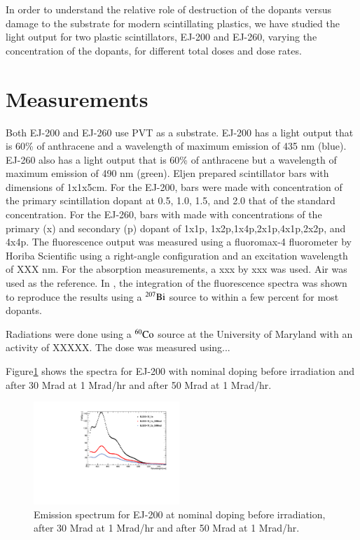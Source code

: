 \documentclass[review]{elsarticle}
\begin{document}
In order to understand the relative role of destruction of the dopants versus damage to the substrate for modern scintillating plastics,
we have studied the light output for two plastic scintillators, EJ-200 and EJ-260, varying the concentration of the dopants, for
different total doses and dose rates.  




\section{Measurements}
Both EJ-200 and EJ-260 use PVT as a substrate.  EJ-200 has a light output that is 60\% of anthracene and a wavelength of maximum emission of 435 nm (blue).  
EJ-260 also has a light output that is 60\% of anthracene but a wavelength of maximum emission of 490 nm (green).  Eljen prepared scintillator bars
with dimensions of 1x1x5cm.  For the EJ-200, bars were made with concentration of the primary scintillation dopant at 0.5, 1.0, 1.5, and 2.0 that of
the standard concentration.  For the EJ-260, bars with made with concentrations of the primary (x) and secondary (p) dopant of 1x1p, 1x2p,1x4p,2x1p,4x1p,2x2p, and 4x4p.
The fluorescence output was measured using a fluoromax-4 fluorometer by Horiba Scientific using a right-angle configuration and an excitation wavelength of
XXX nm.  For the absorption measurements, a xxx by xxx was used.
Air was used as the reference.  In \cite{Bross199135}, the integration
of the fluorescence spectra was shown to reproduce the results using a
$\rm{^{207}Bi}$ source to within a few percent for most dopants.

Radiations were done using a ${\rm ^{60}Co}$ source at the University of Maryland with an activity of XXXXX.  
The dose was measured using...

Figure\ref{fig:ej200doping1x} shows the spectra for EJ-200 with nominal doping before irradiation and after
30 Mrad at 1 Mrad/hr and after 50 Mrad at 1 Mrad/hr.

\begin{figure}[!ht]
\begin{center}
\includegraphics[width=0.49\textwidth]{./figures/plot_EJ200-1X_EMS.pdf}
\caption{
Emission spectrum for EJ-200 at nominal doping before irradiation, after 30 Mrad at 1 Mrad/hr and after 50 Mrad at 1 Mrad/hr.
}
\label{fig:ej200doping1x}
\end{center}
\end{figure}
\end{document}
